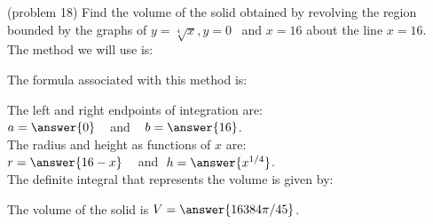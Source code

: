\documentclass[handout]{ximera}
\begin{document}
\begin{problem}(problem 18)
Find the volume of the solid obtained by revolving the region bounded by the graphs of $y = \sqrt[4] x, y = 0$ \, and $x = 16$ about the line $x = 16$.\\
The method we will use is:
\begin{multipleChoice}
\end{multipleChoice}

The formula associated with this method is:
\begin{multipleChoice}
\end{multipleChoice}

The left and right endpoints of integration are:\\
$a = \answer{0}\;\;\;$ and $\;\;\; b = \answer{16}$.\\
The radius and height as functions of $x$ are:\\
$r = \answer{16-x} \;\;\;$ and $\; h = \answer{x^{1/4} }$.\\

The definite integral that represents the volume is given by:\\
\begin{multipleChoice}
\end{multipleChoice}

The volume of the solid is $V = \answer{16384\pi/45}$.

\end{problem}



\end{document}
